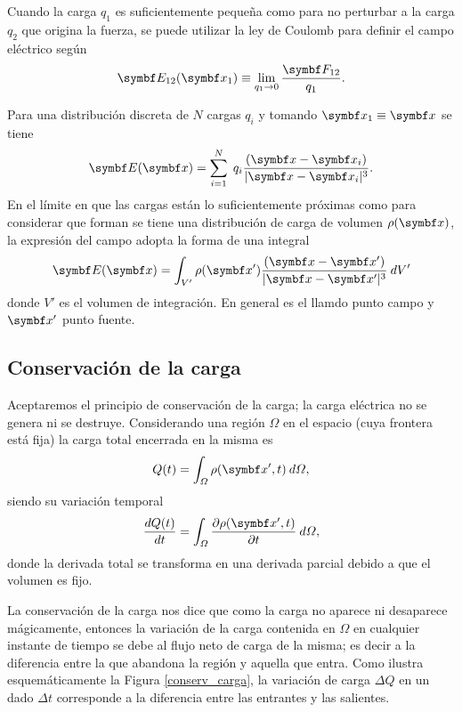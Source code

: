 \documentclass[10pt,oneside]{CBFT_book}
\begin{document}
Cuando la carga $q_1$ es suficientemente pequeña como para no perturbar a la carga $q_2$ que origina la fuerza, se puede 
utilizar la ley de Coulomb para definir el campo eléctrico según
\[
	\vb{E}_{12}(\vb{x}_1) \equiv \lim_{q_1 \to 0} \frac{\vb{F}_{12}}{q_1}.
\]

Para una distribución discreta de $N$ cargas $q_i$ y tomando $\vb{x}_1 \equiv \vb{x}$ se tiene
\[
	\vb{E}(\vb{x}) = \sum_{i=1}^N \; q_i \frac{(\vb{x} - \vb{x}_i)}{|\vb{x} - \vb{x}_i |^3}.
\]
En el límite en que las cargas están lo suficientemente próximas como para considerar que forman se tiene una distribución
de carga de volumen $\rho(\vb{x})$, la expresión del campo adopta la forma de una integral
\[
	\vb{E}(\vb{x}) = \int_{V'} \rho(\vb{x}') \frac{(\vb{x} - \vb{x}')}{|\vb{x} - \vb{x}' |^3} \: dV' 
\]
donde $V'$ es el volumen de integración. En general  es el llamdo punto campo y $\vb{x}'$ punto fuente.

\subsection{Conservación de la carga}

Aceptaremos el principio de conservación de la carga; la carga eléctrica no se genera ni se destruye. 
Considerando una región $\Omega$ en el espacio (cuya frontera está fija) la carga total encerrada en la
misma es 
\[
	Q(t) = \int_\Omega \rho(\vb{x}',t)\: d\Omega,
\]
siendo su variación temporal 
\[
	\dtot{Q(t)}{t} = \int_\Omega \dpar{\rho(\vb{x}',t)}{t} \: d\Omega,
\]
donde la derivada total se transforma en una derivada parcial debido a que el volumen es fijo.

La conservación de la carga nos dice que como la carga no aparece ni desaparece mágicamente, entonces
la variación de la carga contenida en $\Omega$ en cualquier instante de tiempo se debe al flujo neto de 
carga de la misma; es decir a la diferencia entre la que abandona la región y aquella que entra.
Como ilustra esquemáticamente la Figura \ref{conserv_carga}, la variación de carga $\Delta Q$ en un
dado $\Delta t$ corresponde a la diferencia entre las entrantes y las salientes.
\end{document}
